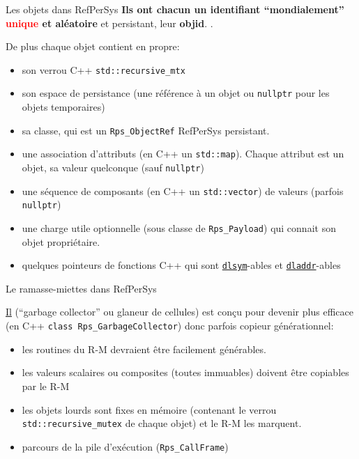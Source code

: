 \documentclass[final,a4,xcolor={svgnames,dvipsnames}]{beamer}
\begin{document}
 
 \begin{frame}{Les objets dans RefPerSys}
   \textbf{Ils ont chacun un identifiant ``mondialement''
     \textcolor{red}{unique} et aléatoire} et persistant, leur
   \textbf{objid}. .

   \medskip
   
   \begin{relsize}{-0.5}
   De plus chaque objet contient en propre:
   \begin{itemize}
   \item son verrou C++ \texttt{std::recursive\_mtx}
     \item son espace de persistance (une référence à un objet ou \texttt{nullptr} pour les objets temporaires)
     \item sa classe, qui est un \texttt{Rps\_ObjectRef} RefPerSys persistant.
     \item une association d'attributs (en C++ un
       \texttt{std::map}). Chaque attribut est un objet, sa valeur
       quelconque (sauf \texttt{nullptr})
     \item une séquence de composants (en C++ un \texttt{std::vector}) de valeurs (parfois \texttt{nullptr})
       \item une charge utile optionnelle (sous classe de
         \texttt{Rps\_Payload}) qui connait son objet propriétaire.
       \item quelques pointeurs de fonctions C++ qui sont
         \href{https://man7.org/linux/man-pages/man3/dlsym.3.html}{\texttt{dlsym}}-ables
         et
         \href{https://man7.org/linux/man-pages/man3/dladdr.3.html}{\texttt{dladdr}}-ables
   \end{itemize}
   \end{relsize}
   \end{frame}

 \begin{frame}{Le ramasse-miettes dans RefPerSys}
   
   \href{https://fr.wikipedia.org/wiki/Ramasse-miettes_(informatique)}{Il}
   (``garbage collector'' ou glaneur de cellules) est conçu pour
   devenir plus efficace (en C++ \texttt{class Rps\_GarbageCollector})
   donc parfois copieur générationnel:

   \begin{itemize}
   \item les routines du R-M devraient être facilement générables.
   \item les valeurs scalaires ou composites (toutes immuables)
     doivent être copiables par le R-M
   \item les objets lourds sont fixes en mémoire (contenant le verrou \texttt{std::recursive\_mutex} de chaque objet) et le R-M les marquent.
     \item parcours de la pile d'exécution (\texttt{Rps\_CallFrame})
   \end{itemize}
 \end{frame}
 
\end{document}
